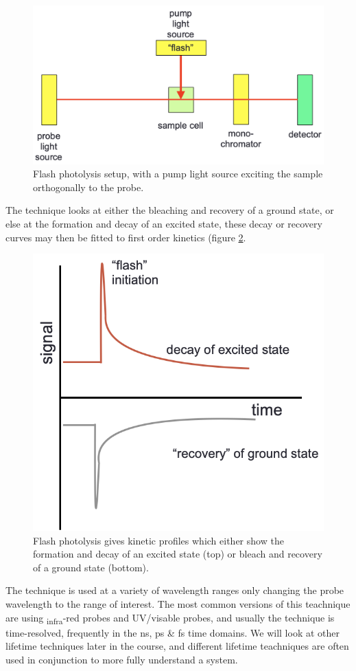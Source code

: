 \documentclass[
]{book}
\begin{document}
\begin{figure}

{\centering \includegraphics[width=0.6\linewidth]{images/flash} 

}

\caption{Flash photolysis setup, with a pump light source exciting the sample orthogonally to the probe.}\label{fig:flash}
\end{figure}

The technique looks at either the bleaching and recovery of a ground state, or else at the formation and decay of an excited state, these decay or recovery curves may then be fitted to first order kinetics (figure \ref{fig:flashdecay}.

\begin{figure}

{\centering \includegraphics[width=0.6\linewidth]{images/flashdecay} 

}

\caption{Flash photolysis gives kinetic profiles which either show the formation and decay of an excited state (top) or bleach and recovery of a ground state (bottom).}\label{fig:flashdecay}
\end{figure}

The technique is used at a variety of wavelength ranges only changing the probe wavelength to the range of interest. The most common versions of this teachnique are using \textsubscript{infra}-red probes and UV/visable probes, and usually the technique is time-resolved, frequently in the ns, ps \& fs time domains. We will look at other lifetime techniques later in the course, and different lifetime teachniques are often used in conjunction to more fully understand a system.
\end{document}
